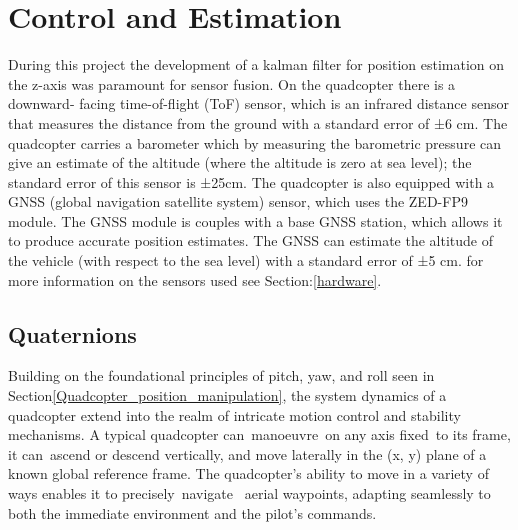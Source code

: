 \documentclass{report}
\begin{document}
\section{Control and Estimation}\label{control_and_estimation} During this
project the development of a kalman filter for position estimation on the z-axis
was paramount for sensor fusion. On the quadcopter there is a downward- facing
time-of-flight (ToF) sensor, which is an infrared distance sensor that measures
the distance from the ground with a standard error of ±6 cm. The quadcopter
carries a barometer which by measuring the barometric pressure can give an
estimate of the altitude (where the altitude is zero at sea level); the standard
error of this sensor is ±25cm. The quadcopter is also equipped with a GNSS
(global navigation satellite system) sensor, which uses the ZED-FP9 module. The
GNSS module is couples with a base GNSS station, which allows it to produce
accurate position estimates. The GNSS can estimate the altitude of the vehicle
(with respect to the sea level) with a standard error of ±5 cm. for more
information on the sensors used see Section:\ref{hardware}.
\subsection{Quaternions}
Building on the foundational principles of pitch, yaw, and roll seen in
Section\ref{Quadcopter_position_manipulation}, the system dynamics of a
quadcopter extend into the realm of intricate motion control and stability
mechanisms. A typical quadcopter can manoeuvre on any axis fixed to its frame,
it can ascend or descend vertically, and move laterally in the (x, y) plane of a
known global reference frame. The quadcopter's ability to move in a variety of
ways enables it to precisely navigate  aerial waypoints, adapting seamlessly to
both the immediate environment and the pilot's commands. 
\end{document}
